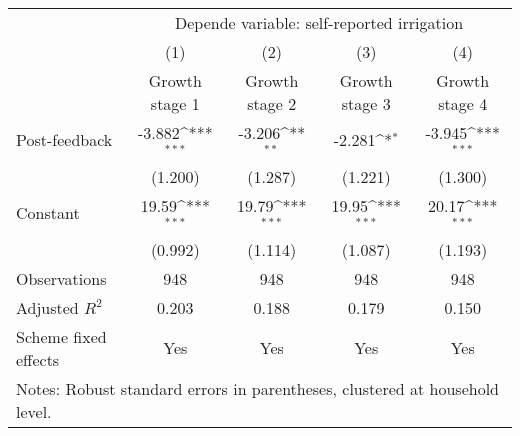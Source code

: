 {
\def\sym#1{\ifmmode^{#1}\else\(^{#1}\)\fi}
\begin{tabular}{l*{4}{c}}
\hline\hline
                    &\multicolumn{4}{c}{Depende variable: self-reported irrigation}                         \\\cmidrule(lr){2-5}
                    &\multicolumn{1}{c}{(1)}&\multicolumn{1}{c}{(2)}&\multicolumn{1}{c}{(3)}&\multicolumn{1}{c}{(4)}\\
                    &\multicolumn{1}{c}{Growth stage 1}&\multicolumn{1}{c}{Growth stage 2}&\multicolumn{1}{c}{Growth stage 3}&\multicolumn{1}{c}{Growth stage 4}\\
\hline
Post-feedback       &      -3.882\sym{***}&      -3.206\sym{**} &      -2.281\sym{*}  &      -3.945\sym{***}\\
                    &     (1.200)         &     (1.287)         &     (1.221)         &     (1.300)         \\
[1em]
Constant            &       19.59\sym{***}&       19.79\sym{***}&       19.95\sym{***}&       20.17\sym{***}\\
                    &     (0.992)         &     (1.114)         &     (1.087)         &     (1.193)         \\
\hline
Observations        &         948         &         948         &         948         &         948         \\
Adjusted \(R^{2}\)  &       0.203         &       0.188         &       0.179         &       0.150         \\
Scheme fixed effects&         Yes         &         Yes         &         Yes         &         Yes         \\
\hline\hline
\multicolumn{5}{l}{\footnotesize Notes: Robust standard errors in parentheses, clustered at household level.}\\
\end{tabular}
}

